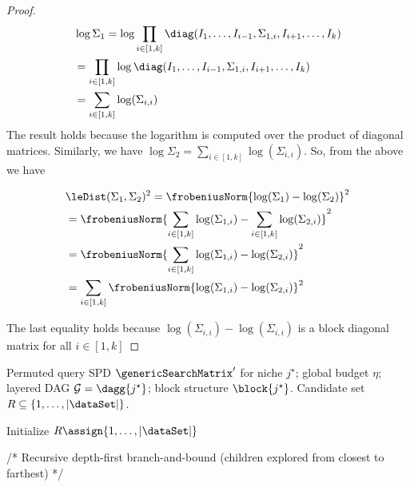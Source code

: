 \documentclass[pdflatex,sn-mathphys-num]{sn-jnl}%
\theoremstyle{thmstyleone}%
\theoremstyle{thmstyletwo}%
\theoremstyle{thmstylethree}%
\begin{document}
\begin{appendices}
\begin{proof}
    \begin{align*}
        & \log \Sigma_1 = \log \prod\limits_{i \in [1, k]} \diag(I_1, \dots, I_{i-1}, \Sigma_{1, i}, I_{i+1}, \dots, I_k) \\
        & = \prod\limits_{i \in [1, k]} \log  \diag(I_1, \dots, I_{i-1}, \Sigma_{1, i},I_{i+1}, \dots, I_k) \\
        & =  \sum\limits_{i \in [1, k]} \log (\Sigma_{i, i})
    \end{align*}
The result holds because the logarithm is computed over the product of diagonal matrices. Similarly, we have $\log \Sigma_2 = \sum\limits_{i \in [1, k]} \log (\Sigma_{i, i})$. So, from the above we have 


\begin{align*}
& \leDist(\Sigma_1, \Sigma_2)^2 = \frobeniusNorm{\log(\Sigma_1) - \log(\Sigma_2)}^2 \\
& = \frobeniusNorm{ \sum\limits_{i \in [1, k]} \log (\Sigma_{1, i}) - \sum\limits_{i \in [1, k]} \log (\Sigma_{2, i})}^2 \\
& = \frobeniusNorm{\sum\limits_{i \in [1, k]}  \log (\Sigma_{1, i}) -  \log (\Sigma_{2, i})}^2 \\
& = \sum\limits_{i \in [1, k]} \frobeniusNorm{ \log (\Sigma_{1, i}) -  \log (\Sigma_{2, i})}^2
\end{align*}

The last equality holds because $\log (\Sigma_{i, i}) -  \log (\Sigma_{i, i})$ is a block diagonal matrix for all $i \in [1, k]$
\end{proof}
\newpage


\begin{algorithm}[h]
\caption{$\DFSBranchAndBound(\genericSearchMatrix',\eta,j^\star,\mathcal{G})$}
\label{alg:dfs-bb}
\begin{algorithmic}[1]
\footnotesize

\Require Permuted query SPD $\genericSearchMatrix'$ for niche $j^\star$; global budget $\eta$; layered DAG $\mathcal{G}=\dagg{j^\star}$; block structure $\block{j^\star}$.
\Ensure Candidate set $R \subseteq \{1,\dots,|\dataSet|\}$.

\State Initialize $R \assign \{1,\dots,|\dataSet|\}$

\Statex /* Recursive depth-first branch-and-bound (children explored from closest to farthest) */


\end{algorithmic}
\end{algorithm}
\end{appendices}
\end{document}
